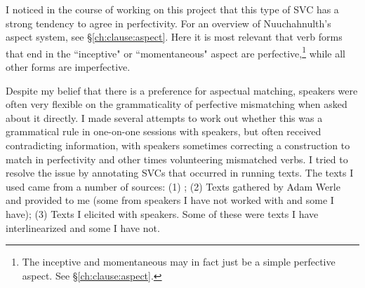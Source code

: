 \begin{comment}
\begin{tikzpicture}[sibling distance=10em,
  every node/.style = {shape=rectangle, align=center}]
\node (aspect) at (0,10) {aspect};
\node (pf) at (1,15) {perfective};
\node (impf) at (1,5) {imperfective};
\node (mo) at (8,15) {momentaneous};
\node (in) at (8,14) {inceptive};
\node (mo-grad-pf) at (8,13) {momentaneous-graduative-perf};
\node (in-grad-pf) at (8,12) {incep-grad-perf};
\node (dr-pf) at (8,11) {durative-perf};
\node (dr-grad-pf) at (8,10) {durative-grad-pf};
\node (rp-pf) at (8,9) {repet-perf};
\node (it-pf) at (8,8) {iter-perf};
\node (ct) at (5,6) {continuative};
\node (dr) at (5,5) {durative};
\node (rp) at (5,4) {repetative};
\node (it) at (5,3) {iterative};
\node (mo-grad) at (5,2) {mo-grad-pf};
\node (in-grad) at (5,1) {in-grad-pf};
\node (dr-grad) at (5,0) {dr-grad-pf};
\draw[->] (aspect) -- (pf);
\draw[->] (aspect) -- (impf);
\draw[->] (pf) -- (mo);
\draw[->] (pf) -- (in);
\draw[->] (pf) -- (mo-grad-pf);
\draw[->] (pf) -- (in-grad-pf);
\draw[->] (pf) -- (dr-pf);
\draw[->] (pf) -- (dr-grad-pf);
\draw[->] (pf) -- (rp-pf);
\draw[->] (pf) -- (it-pf);
\draw[->] (impf) -- (ct);
\draw[->] (impf) -- (dr);
\draw[->] (impf) -- (rp);
\draw[->] (impf) -- (it);
\draw[->] (impf) -- (mo-grad);
\draw[->] (impf) -- (in-grad);
\draw[->] (impf) -- (dr-grad);
\end{tikzpicture}
\end{comment}


I noticed in the course of working on this project that this type of SVC has a strong tendency to agree in perfectivity. For an overview of Nuuchahnulth's aspect system, see \S\ref{ch:clause:aspect}. Here it is most relevant that verb forms that end in the ``inceptive" or ``momentaneous" aspect are perfective,\footnote{The inceptive and momentaneous may in fact just be a simple perfective aspect. See \S\ref{ch:clause:aspect}.} while all other forms are imperfective.

Despite my belief that there is a preference for aspectual matching, speakers were often very flexible on the grammaticality of perfective mismatching when asked about it directly. I made several attempts to work out whether this was a grammatical rule in one-on-one sessions with speakers, but often received contradicting information, with speakers sometimes correcting a construction to match in perfectivity and other times volunteering mismatched verbs. I tried to resolve the issue by annotating SVCs that occurred in running texts. The texts I used came from a number of sources: (1) \citet{sapir1939}; (2) Texts gathered by Adam Werle and provided to me (some from speakers I have not worked with and some I have); (3) Texts I elicited with speakers. Some of these were texts I have interlinearized and some I have not.

